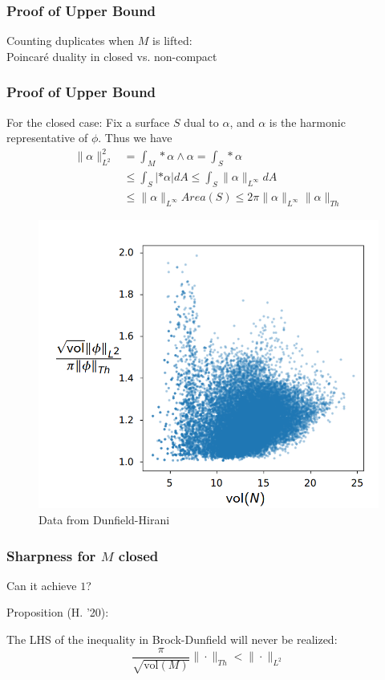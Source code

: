 \documentclass[t]{beamer}
\newcommand{\ds}{\displaystyle}
\newcommand{\pc}{Poincar\'e }
\begin{document}
\begin{frame}[t]
	\frametitle{Proof of Upper Bound}
	Counting duplicates when $M$ is lifted: \\
	\vspace{1.4in}
	\pc duality in closed vs. non-compact
\end{frame}

\begin{frame}[t]
	\frametitle{Proof of Upper Bound}
	For the closed case: Fix a surface $S$ dual to $\alpha$, and $\alpha$ is the harmonic representative of $\phi$. Thus we have
	\begin{align*}
		\|\alpha\|^2_{L^2} & =\int_M *\alpha \wedge \alpha =\int_S *\alpha \\
		&\leq \int_S |*\alpha| dA \leq \int_S \|\alpha\|_{L^\infty} dA  \\ &\leq \|\alpha\|_{L^\infty} Area(S) \leq 2\pi \|\alpha \|_{L^\infty} \|\alpha \|_{Th}
	\end{align*}
\end{frame}

\begin{frame}
	\begin{figure}
		\centering
		\includegraphics[width=.8\linewidth]{Dunfield-Hirani}
		\caption{Data from Dunfield-Hirani}	
	\end{figure}
\end{frame}

\begin{frame}[t]
	\frametitle{Sharpness for $M$ closed}
	Can it achieve $1$? 
	\begin{block}{Proposition (H. '20):}
		
		The LHS of the inequality in Brock-Dunfield will never be realized: 
		\begin{equation}
			\ds \frac{\pi}{\sqrt{\text{vol}(M)}} \| \cdot \|_{Th} < \| \cdot \|_{L^2}
		\end{equation}
	\end{block}
\end{frame}
\end{document}
